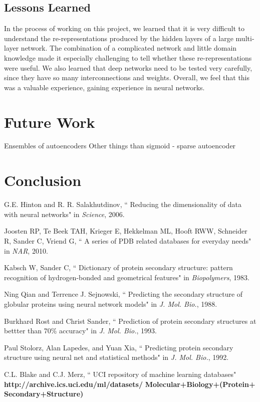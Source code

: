 \documentclass[letterpaper,twocolumn,12pt]{article}
\begin{document}
\subsection{Lessons Learned}
In the process of working on this project, we learned that it is very difficult to understand the re-representations produced by the hidden layers of a large multi-layer network.
The combination of a complicated network and little domain knowledge made it especially challenging to tell whether these re-representations were useful.
We also learned that deep networks need to be tested very carefully, since they have so many interconnections and weights.
Overall, we feel that this was a valuable experience, gaining experience in neural networks.

\section{Future Work}
Ensembles of autoencoders
Other things than sigmoid
- sparse autoencoder 

\section{Conclusion}


\begin{thebibliography}{9}


G.E. Hinton and R. R. Salakhutdinov,
   `` Reducing the dimensionality of data with neural networks"
   in \emph{Science}, 2006.

Joosten RP, Te Beek TAH, Krieger E, Hekkelman ML, Hooft RWW, Schneider R, Sander C, Vriend G,
   `` A series of PDB related databases for everyday needs"
   in \emph{NAR}, 2010.

Kabsch W, Sander C,
   `` Dictionary of protein secondary structure: pattern recognition of hydrogen-bonded and geometrical features"
   in \emph{Biopolymers}, 1983.

Ning Qian and Terrence J. Sejnowski,
  `` Predicting the secondary structure of globular proteins using neural network models"
  in \emph{J. Mol. Bio.}, 1988.

Burkhard Rost and Christ Sander,
  `` Prediction of protein secondary structures at bettter than 70\% accuracy"
  in \emph{J. Mol. Bio.}, 1993.

Paul Stolorz, Alan Lapedes, and Yuan Xia,
   `` Predicting protein secondary structure using neural net and statistical methods"
   in \emph{J. Mol. Bio.}, 1992.

   C.L. Blake and C.J. Merz,
   `` UCI repository of machine learning databases"
   \textbf{http://archive.ics.uci.edu/ml/datasets/}
   \textbf{Molecular+Biology+(Protein+}
   \textbf{Secondary+Structure)}

\end{thebibliography}
\end{document}
